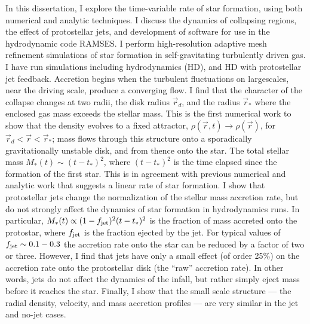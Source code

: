 \documentclass[12pt,notitlepage]{report}
\newcommand{\rhoatt}{\rho(\vec{r},t) \rightarrow \rho(\vec{r})}
\newcommand{\rd}{\vec{r}_d}
\newcommand{\rs}{\vec{r}_*}
\newcommand{\rdrrs}{ \rd < \vec{r} < \rs}
\begin{document}
In this dissertation, I explore the time-variable rate of star formation, using both numerical and analytic techniques. 
I discuss the dynamics of collapsing regions, the effect of protostellar jets, and development of software for use in the hydrodynamic code RAMSES.
I perform high-resolution adaptive mesh refinement simulations of star formation in self-gravitating turbulently driven gas. 
I have run simulations including hydrodynamics (HD), and HD with protostellar jet feedback.
Accretion begins when the turbulent fluctuations on largescales, near the driving scale, produce a converging flow.
I find that the character of the collapse changes at two radii, the disk radius $\rd$, and the radius $\rs$ where the enclosed gas mass exceeds the stellar mass. 
This is the first numerical work to show that the density evolves to a fixed attractor, $\rhoatt$, for $\rdrrs$; mass flows through this structure onto a sporadically gravitationally unstable disk, and from thence onto the star. 
The total stellar mass $M_*(t)\sim (t-t_*)^2$, where $(t-t_*)^2$ is the time elapsed since the formation of the first star. 
This is in agreement with previous numerical and analytic work that suggests a linear rate of star formation.
I show that protostellar jets change the normalization of the stellar mass accretion rate, 
but do not strongly affect the dynamics of star formation in hydrodynamics runs. 
In particular, $M_*(t) \propto (1 - f_{\rm jet})^2 (t-t_*)^2$ is the fraction of mass accreted onto the protostar, 
where $f_{\rm jet}$ is the fraction ejected by the jet. 
For typical values of $f_{\rm jet} \sim 0.1 - 0.3$ the accretion rate onto the star can be reduced by a factor of two or three. 
However, I find that jets have only a small effect (of order 25\%) on the accretion rate onto the protostellar disk (the ``raw'' accretion rate). 
In other words, jets do not affect the dynamics of the infall, but rather simply eject mass before it reaches the star.
Finally, I show that the small scale structure --- the radial density, velocity, and mass accretion profiles --- are very similar in the jet and no-jet cases.

\endabstract 
\newpage

\ifcopyright\copyrightpage\fi
\ifhavededication\dedicationpage\fi
\newpage
\renewcommand\contentsname{\begin{center}  \vspace{-2.5cm}{\Large TABLE \ OF \ CONTENTS}\vspace{-1.5cm} \end{center}}
\renewcommand\listfigurename{\vspace{-2.5cm}{\begin{center}{\Large LIST \ OF \ FIGURES} \end{center}} \vspace{-0.5cm}}
\renewcommand\listtablename{\begin{center} \vspace{-2.5cm}{\Large LIST \ OF \ TABLES}\vspace{-0.5cm} \end{center}}
\end{document}
